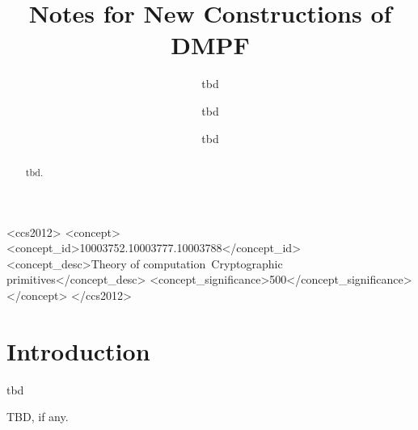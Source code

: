\documentclass[sigconf]{acmart}
\begin{document}
\title{Notes for New Constructions of DMPF}

\author{tbd}
\author{tbd}
\authornotemark[1]

\author{tbd}

\renewcommand{\shortauthors}{tbd et al.}

\begin{abstract}
  tbd. 
\end{abstract}

\begin{CCSXML}
  <ccs2012>
     <concept>
         <concept_id>10003752.10003777.10003788</concept_id>
         <concept_desc>Theory of computation~Cryptographic primitives</concept_desc>
         <concept_significance>500</concept_significance>
         </concept>
   </ccs2012>
\end{CCSXML}
  



\maketitle

\section{Introduction}
tbd





\newpage



\begin{acks}
  TBD, if any. 
\end{acks}





\appendix

\end{document}
